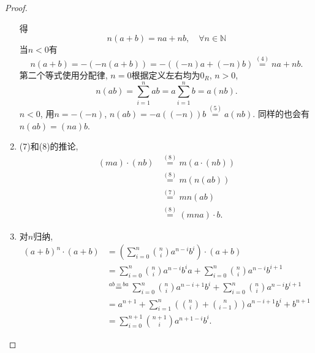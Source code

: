 \begin{proof}
\begin{enumerate}[(1)]
\[        \]
        得
        \[
            n(a + b) = na + nb, \quad \forall n \in \mathbb{N}
        \]
        当$n < 0$有
        \[
            n(a + b) = -(-n(a + b)) = -((-n)a + (-n)b) \overset{(4)}= na + nb.
        \]
        第二个等式使用分配律, $n = 0$根据定义左右均为$0_R$, $n > 0$,
        \[
        n(ab) = \sum_{i = 1}^{n} ab = a\sum_{i = 1}^{n} b = a(nb).
        \]
        $n < 0$, 用$n = -(-n)$, $n(ab) = -a((-n))b \overset{(5)}= a(nb)$. 同样的也会有$n(ab) = (na)b$.
        \item (7)和(8)的推论,
        \[
        \begin{aligned}
            (ma) \cdot (nb) &\overset{(8)}= m(a \cdot (nb))\\
            &\overset{(8)}= m(n(ab))\\
            &\overset{(7)}= mn(ab)\\
            &\overset{(8)}= (mna) \cdot b.
        \end{aligned}
        \]
        \item 对$n$归纳,
        \[
        \begin{aligned}
            (a + b)^n \cdot (a + b) &= \left(\sum_{i = 0}^{n} \binom{n}{i} a^{n - i}b^i\right) \cdot (a + b)\\
            &= \sum_{i = 0}^{n} \binom{n}{i} a^{n - i}b^ia + \sum_{i = 0}^{n} \binom{n}{i} a^{n - i}b^{i + 1}\\
            &\overset{ab = ba}= \sum_{i = 0}^{n} \binom{n}{i} a^{n - i + 1}b^i + \sum_{i = 0}^{n} \binom{n}{i} a^{n - i}b^{i + 1}\\
            &= a^{n + 1} + \sum_{i = 1}^{n} \left(\binom{n}{i} + \binom{n}{i - 1}\right) a^{n - i + 1}b^{i} + b^{n + 1}\\
            &= \sum_{i = 0}^{n + 1} \binom{n + 1}{i} a^{n + 1 - i}b^i.
        \end{aligned}
        \]
    \end{enumerate}
\end{proof}

